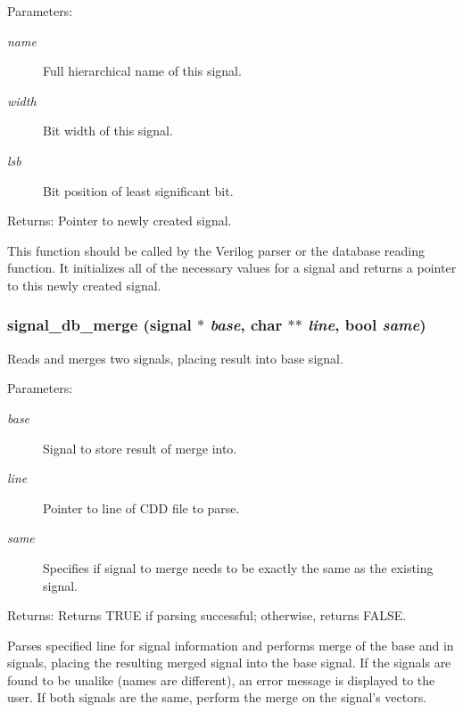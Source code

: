 \begin{Desc}
\item[Parameters:]
\begin{description}
\item[{\em name}]Full hierarchical name of this signal. \item[{\em width}]Bit width of this signal. \item[{\em lsb}]Bit position of least significant bit.\end{description}
\end{Desc}
\begin{Desc}
\item[Returns:]Pointer to newly created signal.\end{Desc}
This function should be called by the Verilog parser or the database reading function. It initializes all of the necessary values for a signal and returns a pointer to this newly created signal. 
\subsubsection{ signal\_\-db\_\-merge ({\bf signal} $\ast$ {\em base}, char $\ast$$\ast$ {\em line}, {\bf bool} {\em same})}\label{signal_8h_a4}


Reads and merges two signals, placing result into base signal. 

\begin{Desc}
\item[Parameters:]
\begin{description}
\item[{\em base}]Signal to store result of merge into. \item[{\em line}]Pointer to line of CDD file to parse. \item[{\em same}]Specifies if signal to merge needs to be exactly the same as the existing signal.\end{description}
\end{Desc}
\begin{Desc}
\item[Returns:]Returns TRUE if parsing successful; otherwise, returns FALSE.\end{Desc}
Parses specified line for signal information and performs merge of the base and in signals, placing the resulting merged signal into the base signal. If the signals are found to be unalike (names are different), an error message is displayed to the user. If both signals are the same, perform the merge on the signal's vectors. 
